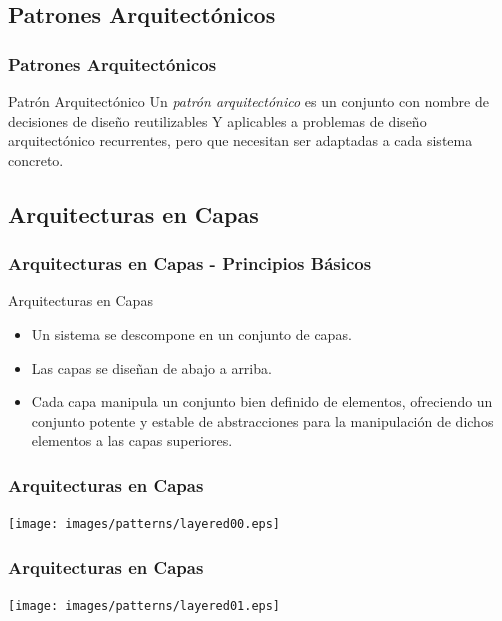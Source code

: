 \documentclass[handout,a4paper,t,xcolor=pst,dvips,colortheme]{beamer}
\begin{document}
\subsection{Patrones Arquitectónicos}

\begin{frame}[c]
	\frametitle{Patrones Arquitectónicos}
    \begin{block}{Patrón Arquitectónico}
        Un \emph{patrón arquitectónico} es un conjunto con nombre de decisiones de diseño reutilizables Y aplicables a problemas de diseño arquitectónico recurrentes, pero que necesitan ser adaptadas a cada sistema concreto.
	\end{block}
\end{frame}

\subsection{Arquitecturas en Capas}

\begin{frame}[c]
    \frametitle{Arquitecturas en Capas - Principios Básicos}
    \begin{block}{Arquitecturas en Capas}
        \begin{itemize}[<+->]
            \item Un sistema se descompone en un conjunto de capas.
            \item Las capas se diseñan de abajo a arriba.
            \item Cada capa manipula un conjunto bien definido de elementos, ofreciendo un \alert{conjunto potente y estable de abstracciones} para la manipulación de dichos elementos a las capas superiores.
        \end{itemize}
    \end{block}
\end{frame}

\begin{frame}[c]
	\frametitle{Arquitecturas en Capas}
	\begin{center}
        \texttt{[image: images/patterns/layered00.eps]}
	\end{center}
\end{frame}

\begin{frame}[c]
	\frametitle{Arquitecturas en Capas}
	\begin{center}
        \texttt{[image: images/patterns/layered01.eps]}
	\end{center}
\end{frame}
\end{document}
